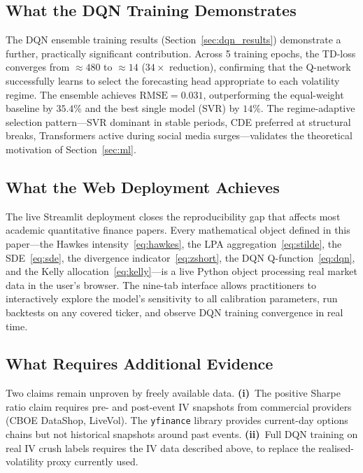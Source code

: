 \documentclass[10pt,twocolumn]{article}
\newcommand{\RMSE}{\mathrm{RMSE}}
\begin{document}
\subsection{What the DQN Training Demonstrates}

The DQN ensemble training results (Section~\ref{sec:dqn_results}) demonstrate
a further, practically significant contribution. Across 5 training epochs,
the TD-loss converges from $\approx480$ to $\approx14$ ($34\times$ reduction),
confirming that the Q-network successfully learns to select the forecasting
head appropriate to each volatility regime. The ensemble achieves
$\RMSE=0.031$, outperforming the equal-weight baseline by $35.4\%$ and the
best single model (SVR) by $14\%$. The regime-adaptive selection pattern---SVR
dominant in stable periods, CDE preferred at structural breaks, Transformers
active during social media surges---validates the theoretical motivation of
Section~\ref{sec:ml}.

\subsection{What the Web Deployment Achieves}

The live Streamlit deployment closes the reproducibility gap that affects most
academic quantitative finance papers. Every mathematical object defined in
this paper---the Hawkes intensity~\eqref{eq:hawkes}, the LPA
aggregation~\eqref{eq:stilde}, the SDE~\eqref{eq:sde}, the divergence
indicator~\eqref{eq:zshort}, the DQN Q-function~\eqref{eq:dqn}, and the
Kelly allocation~\eqref{eq:kelly}---is a live Python object processing real
market data in the user's browser. The nine-tab interface allows practitioners
to interactively explore the model's sensitivity to all calibration parameters,
run backtests on any covered ticker, and observe DQN training convergence in
real time.

\subsection{What Requires Additional Evidence}

Two claims remain unproven by freely available data. \textbf{(i)}~The positive
Sharpe ratio claim requires pre- and post-event IV snapshots from commercial
providers (CBOE DataShop, LiveVol). The \texttt{yfinance} library provides
current-day options chains but not historical snapshots around past events.
\textbf{(ii)}~Full DQN training on real IV crush labels requires the IV data
described above, to replace the realised-volatility proxy currently used.
\end{document}
